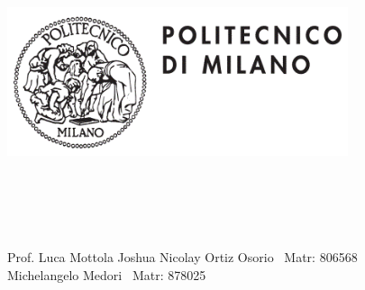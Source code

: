 \documentclass{article}
\begin{document}
\includegraphics[width=10cm, height=5cm]{logo} \break \break

\\

  \\
 \\

\break



\break \break

\break





\begin{flushright}


Prof. Luca Mottola\break 
Joshua Nicolay Ortiz Osorio \ Matr: 806568 \\
Michelangelo Medori \ Matr: 878025

\end{flushright}

\newpage
\end{document}
